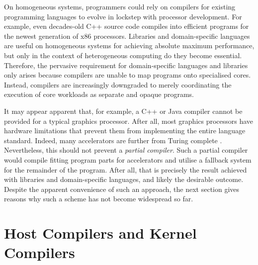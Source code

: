     On homogeneous systems, programmers could rely on compilers for existing
    programming languages to evolve in lockstep with processor development.
    For example, even decades-old C++ source code compiles into efficient
    programs for the newest generation of x86 processors.
    Libraries and domain-specific languages are useful on homogeneous systems
    for achieving absolute maximum performance, but only in the context of
    heterogeneous computing do they become essential.
    Therefore, the pervasive requirement for domain-specific languages and
    libraries only arises because compilers are unable to map programs onto
    specialised cores.
    Instead, compilers are increasingly downgraded to merely coordinating the
    execution of core workloads as separate and opaque programs.

    It may appear apparent that, for example, a C++ or Java compiler cannot
    be provided for a typical graphics processor.
    After all, most graphics processors have hardware limitations that prevent
    them from implementing the entire language standard.
    Indeed, many accelerators are further from Turing complete
    \citep{jouppi2017datacenter}.
    Nevertheless, this should not prevent a {\it partial compiler}.
    Such a partial compiler would compile fitting program parts for accelerators
    and utilise a fallback system for the remainder of the program.
    After all, that is precisely the result achieved with libraries and
    domain-specific languages, and likely the desirable outcome.
    Despite the apparent convenience of such an approach, the next section gives
    reasons why such a scheme has not become widespread so far.

\section{Host Compilers and Kernel Compilers}
\label{sec:hostkernel}

